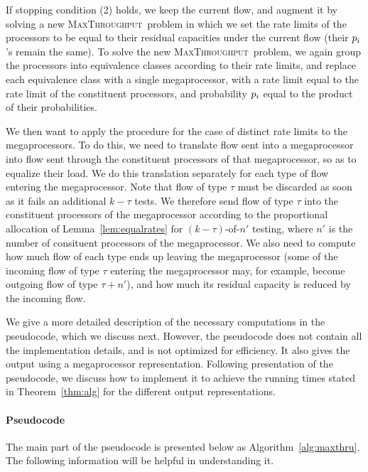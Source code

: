 \documentclass{article}
\newcounter{ass}
\newcommand{\ens}[1]{\ensuremath{#1}}					\newcommand{\card}[1]{\ens{|#1|}}							\newcommand{\dotlist}[2]{\ens{#1,\ldots,#2}}
\newcommand{\valn}{\ens{n}}
\newcommand{\maxthru}{\textsc{MaxThroughput}}
\newcommand{\flowtype}{\ens{\tau}}
\newcommand{\processor}{processor}
\newcommand{\megaprocessor}{mega\processor}
\begin{document}
If stopping condition (2) holds, we keep the current flow, and
augment it by solving a new \maxthru\ problem in which
we set the rate limits of the {\processor}s to be equal to their residual
capacities under the current flow (their $\pr i$'s remain the same).
To solve the new \maxthru\ problem, we 
again group the {\processor}s into equivalence
classes according to their rate limits, and
replace each equivalence class with a single
{\megaprocessor}, with a rate limit equal to the
rate limit of the constituent {\processor}s, and probability $\pr i$ equal
to the product of their probabilities.

We then want to apply the procedure for
the case of distinct rate limits to the {\megaprocessor}s.
To do this, we need to
translate flow sent into a {\megaprocessor}
into flow sent through the constituent {\processor}s of
that {\megaprocessor}, so as to equalize their load.
We do this translation separately for each type of flow
entering the {\megaprocessor}.  Note that flow of type \flowtype{} 
must be discarded as soon as it fails an additional $k-\flowtype$
tests. 
We therefore send flow of type \flowtype{} 
into the constituent {\processor}s of the {\megaprocessor}
according to the proportional allocation of
Lemma~\ref{lem:equalrates} for $(k-\flowtype)$-of-$\valn'$ 
testing, where $\valn'$ is the number of consituent {\processor}s
of the {\megaprocessor}.
We also need to compute how much flow of each type
ends up leaving the {\megaprocessor} (some of the incoming flow of
type \flowtype{} entering
the {\megaprocessor} may, for example, become outgoing flow of type $\flowtype+n'$),
and how much its residual capacity is reduced by the incoming flow.

We give a more detailed description of the necessary computations
in the pseudocode, which we discuss next.  However, the pseudocode 
does not contain all the implementation details, and is not 
optimized for efficiency.  It also gives the 
output using a megaprocessor representation.  Following presentation of the pseudocode,
we discuss how to implement it to
achieve the running times stated in Theorem~\ref{thm:alg} for the different
output representations.

\paragraph{Pseudocode}

The main part of the pseudocode is presented below as Algorithm~\ref{alg:maxthru}. 
The following information will be helpful
in understanding it.
\end{document}
